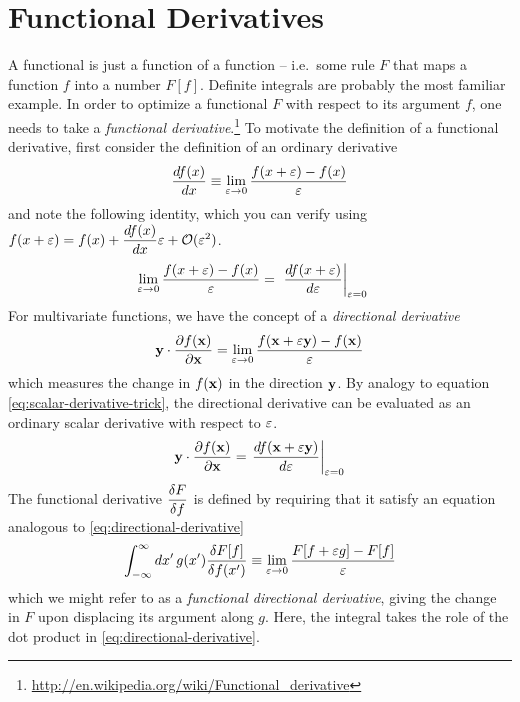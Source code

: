 \documentclass[11pt]{article}
\numberwithin{equation}{section}
\begin{document}
\newpage
\section{Functional Derivatives}\label{app:functional-optimization}

A functional is just a function of a function -- i.e.\ some rule $F$ that maps a function $f$ into a number $F[f]$.  Definite integrals are probably the most familiar example.
In order to optimize a functional $F$ with respect to its argument $f$, one needs to take a \textit{functional derivative}.\footnote{\url{http://en.wikipedia.org/wiki/Functional_derivative}}
To motivate the definition of a functional derivative, first consider the definition of an ordinary derivative
\begin{align}
	\frac {d f(x)}{d x}
\equiv
  \lim_{\varepsilon\rightarrow0}
	\frac {f(x+\varepsilon)-f(x)}{\varepsilon}
\end{align}
and note the following identity, which you can verify using
$
  f(x+\varepsilon)
=
  f(x)
+
  \dfrac{d f(x)}{d x}
  \varepsilon
+
  \mathcal{O}(\varepsilon^2)
$.
\begin{align}\label{eq:scalar-derivative-trick}
  \lim_{\varepsilon\rightarrow0}
	\frac {f(x+\varepsilon)-f(x)}{\varepsilon}
=&\
\left.
	\frac {df(x+\varepsilon)}{d\varepsilon}
\right|_{\varepsilon=0}
\end{align}
For multivariate functions, we have the concept of a \textit{directional derivative}
\begin{align}\label{eq:directional-derivative}
  \mathbf{y}\cdot
  \frac {\partial f(\mathbf{x})}{\partial\mathbf{x}}
=
  \lim_{\varepsilon\rightarrow0}
  \frac {f(\mathbf{x}+\varepsilon\mathbf{y}) - f(\mathbf{x})}{\varepsilon}
\end{align}
which measures the change in $f(\mathbf{x})$ in the direction $\mathbf{y}$.
By analogy to equation \ref{eq:scalar-derivative-trick}, the directional derivative can be evaluated as an ordinary scalar derivative with respect to $\varepsilon$.
\begin{align}\label{eq:vector-derivative-trick}
  \mathbf{y}\cdot
  \frac {\partial f(\mathbf{x})}{\partial\mathbf{x}}
=
  \left.
  \frac {d f(\mathbf{x} + \varepsilon\mathbf{y})}{d \varepsilon}
  \right|_{\varepsilon=0}
\end{align}
The functional derivative $\dfrac{\delta  F}{\delta  f}$ is defined by requiring that it satisfy an equation analogous to \ref{eq:directional-derivative}
\begin{align}
  \int_{-\infty}^{\infty}
  dx'\,
  g(x')
  \frac {\delta  F[f]}{\delta  f(x')}
\equiv
  \lim_{\varepsilon\rightarrow0}
  \frac {F[f+\varepsilon g] - F[f]}{\varepsilon}
\end{align}
which we might refer to as a \textit{functional directional derivative}, giving the change in $F$ upon displacing its argument along $g$.
Here, the integral takes the role of the dot product in \ref{eq:directional-derivative}.
\end{document}
